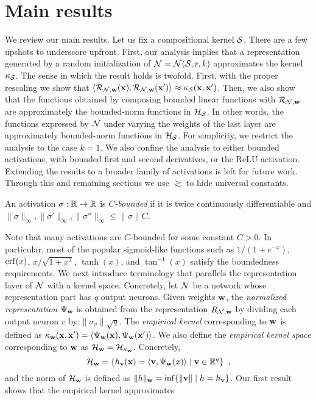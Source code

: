 \section{Main results} \label{results:sec}
%
We review our main results. Let us fix a compositional kernel ${\cal S}$. There are a
few upshots to underscore upfront. First, our analysis implies that a
representation generated by a random initialization of ${\cal N}={\cal N}({\cal S},r,k)$
approximates the kernel $\kappa_{\cal S}$. The sense in which the result holds is
twofold. First, with the proper rescaling we show that
$\langle \mathcal{R}_{{\cal N},{\mathbf w}}({\mathbf x}),\mathcal{R}_{{\cal N},{\mathbf w}}({\mathbf x}') \rangle\approx \kappa_{{\cal S}}({\mathbf x},{\mathbf x}')$.
Then, we also show that the functions obtained by composing
bounded linear functions with $\mathcal{R}_{{\cal N},{\mathbf w}}$ are approximately the bounded-norm functions in ${\cal H}_{\cal S}$. In other words, the functions
expressed by ${\cal N}$ under varying the weights of the last layer are
approximately bounded-norm functions in ${\cal H}_{\cal S}$. For simplicity, we restrict
the analysis to the case $k=1$. We also confine the analysis to either bounded
activations, with bounded first and second derivatives, or the ReLU activation.
Extending the results to a broader family of activations is left for future
work. Through this and remaining sections we use $\gtrsim$ to hide universal constants.
%
\begin{definition}
%
An activation $\sigma:{\mathbb R}\to{\mathbb R}$ is {\em $C$-bounded} if it is twice
continuously differentiable and $\|\sigma\|_{\infty},
\|\sigma'\|_{\infty},\|\sigma''\|_\infty\le \|\sigma\|C$.
%
\end{definition}
%
\noindent Note that many activations are $C$-bounded for some constant $C>0$. In
particular, most of the popular sigmoid-like functions such as
${1}/({1+e^{-x}})$, $\operatorname*{erf}(x)$, ${x}/{\sqrt{1+x^2}}$, $\tanh(x)$,
and $\tan^{-1}(x)$ satisfy the boundedness requirements. We next introduce
terminology that parallels the representation layer of ${\cal N}$ with a kernel
space. Concretely, let ${\cal N}$ be a network whose representation part has $q$
output neurons. Given weights ${\mathbf w}$, the {\em normalized representation}
$\Psi_{\mathbf w}$ is obtained from the representation $R_{{\cal N},{\mathbf w}}$ by
dividing each output neuron $v$ by $\|\sigma_v\|\sqrt{q}$. The {\em empirical
kernel} corresponding to ${\mathbf w}$ is defined as
$\kappa_{\mathbf w}({\mathbf x},{\mathbf x}')=\langle \Psi_{{\mathbf w}}({\mathbf x}),\Psi_{{\mathbf w}}({\mathbf x}') \rangle$. We also define the
{\em empirical kernel space} corresponding to ${\mathbf w}$ as
${\cal H}_{\mathbf w}={\cal H}_{\kappa_{\mathbf w}}$. Concretely,
\[
{\cal H}_{\mathbf w}=\left\{h_{{\mathbf v}}({\mathbf x})=\langle {\mathbf v},\Psi_{\mathbf w}(x) \rangle\mid {\mathbf v}\in{\mathbb R}^q\right\}~,
\]
and the norm of ${\cal H}_{\mathbf w}$ is defined as $\|h\|_{\mathbf w}=\inf\{\|{\mathbf v}\|\mid{}h=h_{\mathbf v}\}$. Our first result shows that the empirical kernel approximates
